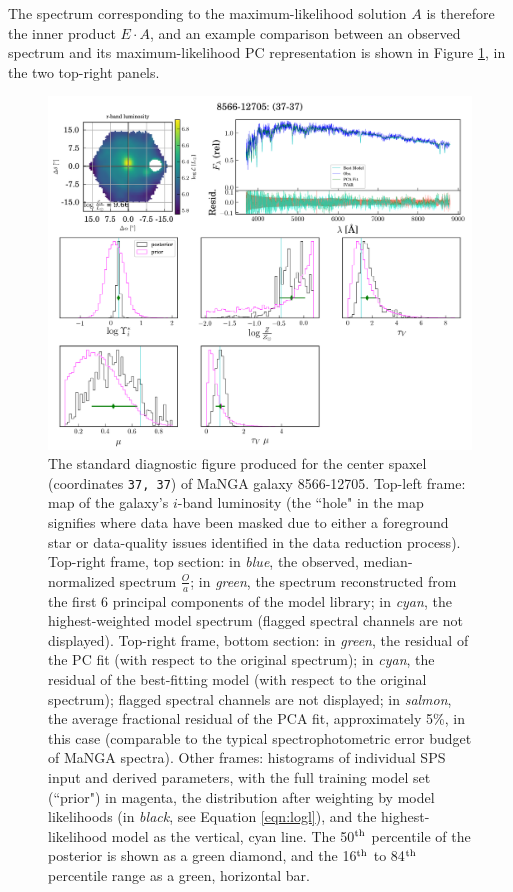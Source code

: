 The spectrum corresponding to the maximum-likelihood solution $A$ is therefore the inner product $E \cdot A$, and an example comparison between an observed spectrum and its maximum-likelihood PC representation is shown in Figure \ref{fig:sample_fit}, in the two top-right panels.

\begin{figure}
    \centering
    \includegraphics[width=\textwidth,height=0.9\textheight,keepaspectratio]{8566-12705_fulldiag_37-37}
    \caption[MaNGA spaxel diagnostic figure from PC fits]{\fixspacing The standard diagnostic figure produced for the center spaxel (coordinates \texttt{37, 37}) of MaNGA galaxy 8566-12705. Top-left frame: map of the galaxy's $i$-band luminosity (the ``hole" in the map signifies where data have been masked due to either a foreground star or data-quality issues identified in the data reduction process). Top-right frame, top section: in \textit{blue}, the observed, median-normalized spectrum $\frac{O}{a}$; in \textit{green}, the spectrum reconstructed from the first 6 principal components of the model library; in \textit{cyan}, the highest-weighted model spectrum (flagged spectral channels are not displayed). Top-right frame, bottom section: in \textit{green}, the residual of the PC fit (with respect to the original spectrum); in \textit{cyan}, the residual of the best-fitting model (with respect to the original spectrum); flagged spectral channels are not displayed; in \textit{salmon}, the average fractional residual of the PCA fit, approximately 5\%, in this case (comparable to the typical spectrophotometric error budget of MaNGA spectra). Other frames: histograms of individual SPS input and derived parameters, with the full training model set (``prior") in magenta, the distribution after weighting by model likelihoods (in \emph{black}, see Equation \ref{eqn:logl}), and the highest-likelihood model as the vertical, cyan line. The 50$^{\rm th}$ percentile of the posterior is shown as a green diamond, and the 16$^{\rm th}$ to 84$^{\rm th}$ percentile range as a green, horizontal bar.}
    \label{fig:sample_fit}
\end{figure}

